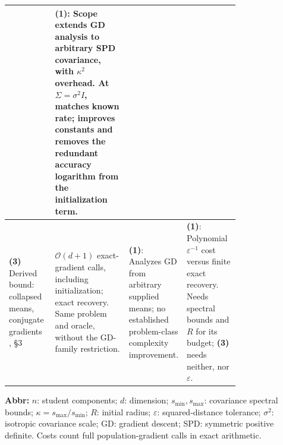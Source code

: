 \begin{table}[tp]
\begin{threeparttable}
\begin{tabularx}{\linewidth}{@{}>{\raggedright\arraybackslash}p{0.20\linewidth}>{\raggedright\arraybackslash}p{0.32\linewidth}>{\raggedright\arraybackslash}p{0.25\linewidth}>{\raggedright\arraybackslash}X@{}}
& \textbf{(1)}: Scope extends GD analysis to arbitrary SPD covariance, with $\kappa^2$ overhead. At $\Sigma=\sigma^2I$, matches known rate; improves constants and removes the redundant accuracy logarithm from the initialization term.
& \\
\midrule
\textbf{(3)} Derived bound: collapsed means, conjugate gradients \citep{gcrfHestenesStiefel1952}, \S3
& $\mathcal{O}(d+1)$ exact-gradient calls, including initialization; exact recovery. Same problem and oracle, without the GD-family restriction.
& \textbf{(1)}: Analyzes GD from arbitrary supplied means; no established problem-class complexity improvement.
& \textbf{(1)}: Polynomial $\varepsilon^{-1}$ cost versus finite exact recovery. Needs spectral bounds and $R$ for its budget; \textbf{(3)} needs neither, nor $\varepsilon$. \\
\bottomrule
\end{tabularx}
\begin{tablenotes}[flushleft]\footnotesize
\item[] \textbf{Abbr:} $n$: student components; $d$: dimension; $s_{\min},s_{\max}$: covariance spectral bounds; $\kappa=s_{\max}/s_{\min}$; $R$: initial radius; $\varepsilon$: squared-distance tolerance; $\sigma^2$: isotropic covariance scale; GD: gradient descent; SPD: symmetric positive definite. Costs count full population-gradient calls in exact arithmetic.
\end{tablenotes}
\end{threeparttable}
\end{table}
\clearpage
